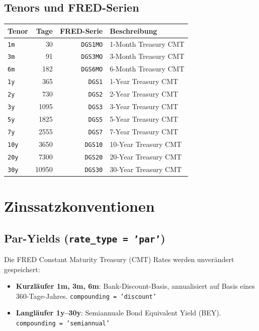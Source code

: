 \documentclass[11pt, a4paper]{article}
\begin{document}
\subsection{Tenors und FRED-Serien}

\begin{tabular}{lrrl}
  \toprule
  Tenor & Tage & FRED-Serie & Beschreibung \\
  \midrule
  \texttt{1m}  &    30 & \texttt{DGS1MO} & 1-Month Treasury CMT \\
  \texttt{3m}  &    91 & \texttt{DGS3MO} & 3-Month Treasury CMT \\
  \texttt{6m}  &   182 & \texttt{DGS6MO} & 6-Month Treasury CMT \\
  \texttt{1y}  &   365 & \texttt{DGS1}   & 1-Year Treasury CMT \\
  \texttt{2y}  &   730 & \texttt{DGS2}   & 2-Year Treasury CMT \\
  \texttt{3y}  &  1095 & \texttt{DGS3}   & 3-Year Treasury CMT \\
  \texttt{5y}  &  1825 & \texttt{DGS5}   & 5-Year Treasury CMT \\
  \texttt{7y}  &  2555 & \texttt{DGS7}   & 7-Year Treasury CMT \\
  \texttt{10y} &  3650 & \texttt{DGS10}  & 10-Year Treasury CMT \\
  \texttt{20y} &  7300 & \texttt{DGS20}  & 20-Year Treasury CMT \\
  \texttt{30y} & 10950 & \texttt{DGS30}  & 30-Year Treasury CMT \\
  \bottomrule
\end{tabular}

\section{Zinssatzkonventionen}
\label{sec:conventions}

\subsection{Par-Yields (\texttt{rate\_type = 'par'})}

Die FRED Constant Maturity Treasury (CMT) Rates werden unverändert
gespeichert:

\begin{itemize}
  \item \textbf{Kurzläufer 1m, 3m, 6m}: Bank-Discount-Basis,
        annualisiert auf Basis eines 360-Tage-Jahres.
        \texttt{compounding = 'discount'}
  \item \textbf{Langläufer 1y--30y}: Semiannuale Bond Equivalent Yield
        (BEY). \texttt{compounding = 'semiannual'}
\end{itemize}
\end{document}
